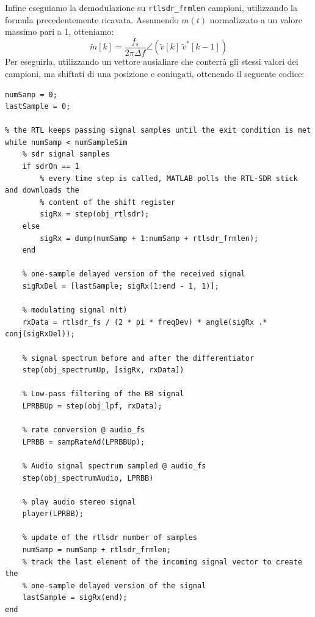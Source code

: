 Infine eseguiamo la demodulazione su \texttt{rtlsdr\_frmlen} campioni, utilizzando la formula precedentemente ricavata. Assumendo \( m(t) \) normalizzato a un valore massimo pari a 1, otteniamo:
\[
    \tilde{m}[k] = \frac{f_s}{2\pi \Delta f} \angle \left( \tilde{v}[k] \ \tilde{v}^*[k-1] \right)
\]
Per eseguirla, utilizzando un vettore ausialiare che conterrà gli stessi valori dei campioni, ma shiftati di una posizione e coniugati, ottenendo il seguente codice:
\begin{verbatim}
numSamp = 0;
lastSample = 0;

% the RTL keeps passing signal samples until the exit condition is met
while numSamp < numSampleSim
    % sdr signal samples
    if sdrOn == 1
        % every time step is called, MATLAB polls the RTL-SDR stick and downloads the 
        % content of the shift register
        sigRx = step(obj_rtlsdr);
    else
        sigRx = dump(numSamp + 1:numSamp + rtlsdr_frmlen);
    end

    % one-sample delayed version of the received signal
    sigRxDel = [lastSample; sigRx(1:end - 1, 1)];

    % modulating signal m(t)
    rxData = rtlsdr_fs / (2 * pi * freqDev) * angle(sigRx .* conj(sigRxDel));

    % signal spectrum before and after the differentiator
    step(obj_spectrumUp, [sigRx, rxData])

    % Low-pass filtering of the BB signal
    LPRBBUp = step(obj_lpf, rxData);

    % rate conversion @ audio_fs
    LPRBB = sampRateAd(LPRBBUp);

    % Audio signal spectrum sampled @ audio_fs
    step(obj_spectrumAudio, LPRBB)

    % play audio stereo signal
    player(LPRBB);

    % update of the rtlsdr number of samples
    numSamp = numSamp + rtlsdr_frmlen;
    % track the last element of the incoming signal vector to create the
    % one-sample delayed version of the signal
    lastSample = sigRx(end);
end
\end{verbatim}